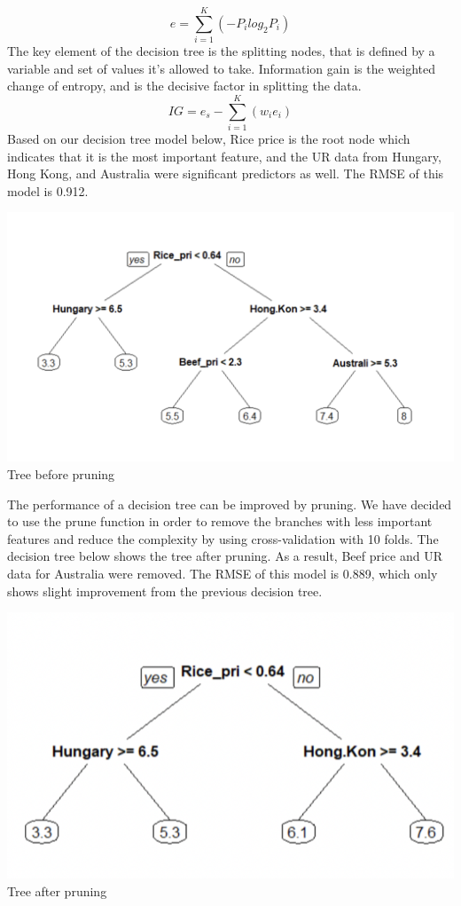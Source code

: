 \documentclass{article}
\begin{document}
	\begin{equation}
		e= \sum_{i=1}^{K}(-P_{i} log_2 P_{i})
	\end{equation}
	The key element of the decision tree is the splitting nodes, that is defined by a variable and set of values it’s allowed to take. Information gain is the weighted change of entropy, and is the decisive factor in splitting the data.
	\begin{equation}
		IG =e_s - \sum_{i=1}^{K}(w_i e_i)
	\end{equation}
	Based on our decision tree model below, Rice price is the root node which indicates that it is the most important feature, and the UR data from Hungary, Hong Kong, and Australia were significant predictors as well. The RMSE of this model is 0.912.
	\begin{center}
		\includegraphics[width=1\textwidth]{assets/decisionTree.png}
		{Tree before pruning }
	\end{center}
	The performance of a decision tree can be improved by pruning. We have decided to use the prune function in order to remove the branches with less important features and reduce the complexity by using cross-validation with 10 folds. The decision tree below shows the tree after pruning. As a result, Beef price and UR data for Australia were removed. The RMSE of this model is 0.889, which only shows slight improvement from the previous decision tree. 
	\begin{center}
		\includegraphics[width=1\textwidth]{assets/prunedTree.png}
		{Tree after pruning}
	\end{center}
\end{document}
